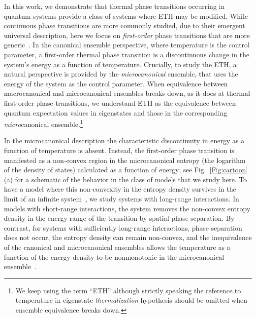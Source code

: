 \documentclass[aps,prx,showpacs,amsmath,amssymb,superscriptaddress,twocolumn,longbibliography,10pt,nofootinbib]{revtex4-2}
\begin{document}
In this work, we demonstrate that thermal phase transitions occurring in quantum systems provide a class of systems where ETH may be modified. While continuous phase transitions are more commonly studied, due to their emergent universal description, here we focus on \emph{first-order} phase transitions that are more generic~\cite{Binder87}.  In the canonical ensemble perspective, where temperature is the control parameter, a first-order thermal phase transition is  a discontinuous change in the system's energy as a function of temperature. Crucially, to study the ETH, a natural perspective is provided by the \emph{microcanonical} ensemble, that uses the energy of the system as the control parameter. When equivalence between macrocanonical and microcanonical ensembles breaks down, as it does at thermal first-order phase transitions, we understand ETH as the equivalence between quantum expectation values in eigenstates and those in the corresponding {\it micro}canonical ensemble.\footnote{We keep using the term ``ETH'' although strictly speaking the reference to temperature in eigenstate \emph{thermalization} hypothesis should be omitted when ensemble equivalence breaks down.}

In the microcanonical description the characteristic discontinuity in energy as a function of temperature is absent. Instead, the first-order phase transition is manifested as a non-convex region in the microcanonical entropy (the logarithm of the density of states) calculated as a function of energy; see Fig.~\ref{Fig:cartoon}(a) for a schematic of the behavior in the class of models that we study here. To have a model where this non-convexity in the entropy density survives in the limit of an infinite system~\cite{Binder87}, we study systems with long-range interactions.  In models with short-range 
interactions, the system removes the non-convex entropy density in the energy range of the transition by spatial phase separation. By contrast, for systems with sufficiently long-range interactions, phase separation does not occur, the entropy density can remain non-convex, and the inequivalence of the canonical and microcanonical ensembles allows the temperature as a function of the energy density to be nonmonotonic in the microcanonical ensemble~\cite{Thirring70,Gross2001}.
\end{document}
